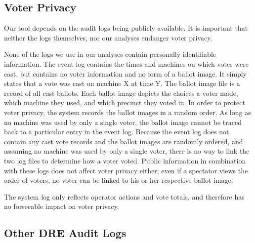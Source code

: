 \documentclass[letterpaper,twocolumn,10pt]{article}
\begin{document}
\subsection{Voter Privacy}
Our tool depends on the audit logs being publicly available. It is important
that neither the logs themselves, nor our analyses endanger voter privacy. 

None of the logs we use in our analyses contain personally identifiable
information. The event log contains the times and machines on which votes  
were cast, but contains no voter information and no form of a ballot image. It
simply  
states that a vote was cast on machine X at time Y. The ballot image file is a 
record of all cast ballots.  Each ballot image 
depicts the choices a voter made, which machine they used, and which precinct they 
voted in. In order to protect voter privacy, the system records the ballot images 
in a random order. As long as no machine was used by only a single voter, the
ballot image cannot be traced back 
to a particular entry in the event log. Because the event log does not 
contain any cast vote records and the ballot images are randomly ordered, and
assuming no machine was used by only a single voter, there is 
no way to link the two log files to determine how a voter voted. Public
information in combination with these logs does not affect voter privacy either;
even if a spectator views the order of voters, no voter can be linked to his or
her respective ballot image.     

The system log only reflects operator actions and vote
totals, and therefore has no forseeable impact on voter privacy. 

\subsection{Other DRE Audit Logs}
\end{document}
